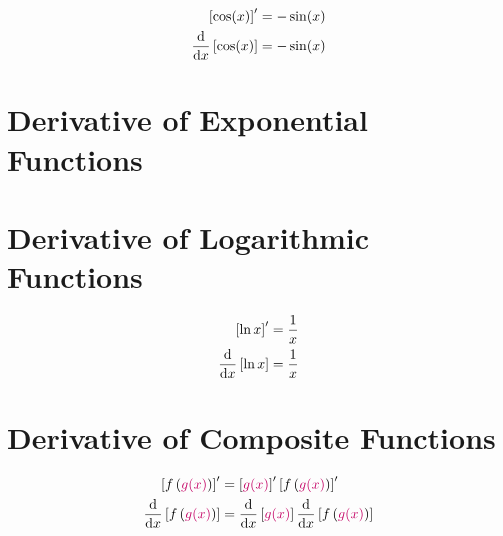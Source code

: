 \begin{arule}
\begin{align}
	\left[ \cos(x) \right]' &= -\sin (x) \label{eq:dcos1} \\
	\dfrac{\mathrm{d}}{\mathrm{d}x} \left[ \cos(x) \right] & = -\sin (x)  \label{eq:dcos2}
\end{align}
\end{arule}

\section{Derivative of Exponential Functions}

\section{Derivative of Logarithmic Functions}

\begin{arule}
\begin{align}
	\left[\ln x \right]' &= \frac{1}{x} \label{eq:dnl1} \\
	\dfrac{\mathrm{d}}{\mathrm{d}x} \left[\ln x \right] &= \frac{1}{x}  \label{eq:dnl2}
\end{align}
\end{arule}




\section{Derivative of Composite Functions}


\begin{arule}
\begin{align}
	\left[f \left( \cRed{g(x)} \right) \right]' &= \left[\cRed{g(x)} \right]' \left[f\left(\cRed{g(x)}\right)\right]' \label{eq:dcf1} \\
	\dfrac{\dd}{\dx} \left[f \left( \cRed{g(x)} \right) \right] &= \dfrac{\dd}{\dx} \left[\cRed{g(x)} \right] \dfrac{\dd}{\dx} \left[f\left(\cRed{g(x)}\right)\right]  \label{eq:dcf2}
\end{align}
\end{arule}

